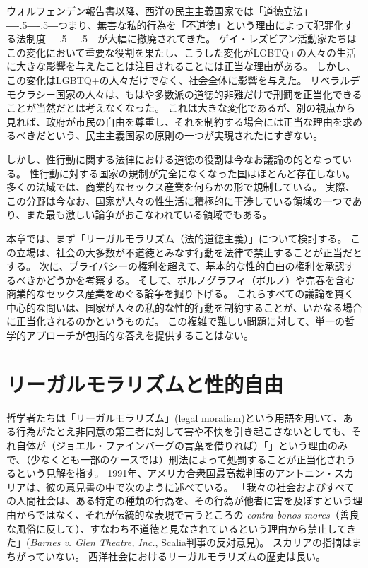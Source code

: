 \documentclass[paper=a4,book,openany]{jlreq}
\def\DDASH{―\kern-.5\zw―\kern-.5\zw―} %
\begin{document}
ウォルフェンデン報告書以降、西洋の民主主義国家では「道徳立法」{\DDASH}つまり、無害な私的行為を「不道徳」という理由によって犯罪化する法制度{\DDASH}が大幅に撤廃されてきた。
ゲイ・レズビアン活動家たちはこの変化において重要な役割を果たし、こうした変化がLGBTQ+の人々の生活に大きな影響を与えたことは注目されることには正当な理由がある。
しかし、この変化はLGBTQ+の人々だけでなく、社会全体に影響を与えた。
リベラルデモクラシー国家の人々は、もはや多数派の道徳的非難だけで刑罰を正当化できることが当然だとは考えなくなった。
これは大きな変化であるが、別の視点から見れば、政府が市民の自由を尊重し、それを制約する場合には正当な理由を求めるべきだという、民主主義国家の原則の一つが実現されたにすぎない。

しかし、性行動に関する法律における道徳の役割は今なお議論の的となっている。
性行動に対する国家の規制が完全になくなった国はほとんど存在しない。
多くの法域では、商業的なセックス産業を何らかの形で規制している。
実際、この分野は今なお、国家が人々の性生活に積極的に干渉している領域の一つであり、また最も激しい論争がおこなわれている領域でもある。

本章では、まず「リーガルモラリズム（法的道徳主義）」について検討する。
この立場は、社会の大多数が不道徳とみなす行動を法律で禁止することが正当だとする。
次に、プライバシーの権利を超えて、基本的な性的自由の権利を承認するべきかどうかを考察する。
そして、ポルノグラフィ（ポルノ）や売春を含む商業的なセックス産業をめぐる論争を掘り下げる。
これらすべての議論を貫く中心的な問いは、国家が人々の私的な性的行動を制約することが、いかなる場合に正当化されるのかというものだ。
この複雑で難しい問題に対して、単一の哲学的アプローチが包括的な答えを提供することはない。

\section{リーガルモラリズムと性的自由}

哲学者たちは「リーガルモラリズム」(legal moralism)という用語を用いて、ある行為がたとえ非同意の第三者に対して害や不快を引き起こさないとしても、それ自体が（ジョエル・ファインバーグの言葉を借りれば）「」という理由のみで、（少なくとも一部のケースでは）刑法によって処罰することが正当化されうるという見解を指す\citep[p.249]{feinberg87:_some_unswep_debris_hart_devlin_debat}。
1991年、アメリカ合衆国最高裁判事のアントニン・スカリアは、彼の意見書の中で次のように述べている。
「我々の社会およびすべての人間社会は、ある特定の種類の行為を、その行為が他者に害を及ぼすという理由からではなく、それが伝統的な表現で言うところの \emph{contra bonos mores}（善良な風俗に反して）、すなわち不道徳と見なされているという理由から禁止してきた」(\emph{Barnes v. Glen Theatre, Inc.}, Scalia判事の反対意見)。
スカリアの指摘はまちがっていない。
西洋社会におけるリーガルモラリズムの歴史は長い。
\end{document}
